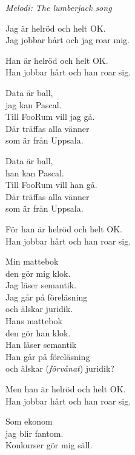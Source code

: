 {\footnotesize\textit{Melodi: The lumberjack song}}\par
\vspace{10pt}
Jag är helröd och helt OK.\\
Jag jobbar hårt och jag roar mig.\par
\vspace{10pt}
Han är helröd och helt OK.\\
Han jobbar hårt och han roar sig.\par
\vspace{10pt}
Data är ball,\\
jag kan Pascal.\\
Till FooRum vill jag gå.\\
Där träffas alla vänner\\
som är från Uppsala.\par
\vspace{10pt}
Data är ball,\\
han kan Pascal.\\
Till FooRum vill han gå.\\
Där träffas alla vänner\\
som är från Uppsala.\par
\vspace{10pt}
För han är helröd och helt OK.\\
Han jobbar hårt och han roar sig.\par
\vspace{10pt}
Min mattebok\\
den gör mig klok.\\
Jag läser semantik.\\
Jag går på föreläsning\\
och älskar juridik.\\
\newpage
Hans mattebok\\
den gör han klok.\\
Han läser semantik\\
Han går på föreläsning\\
och älskar (\textit{förvånat}) juridik?\par
\vspace{10pt}
Men han är helröd och helt OK.\\
Han jobbar hårt och han roar sig.\par
\vspace{10pt}
Som ekonom\\
jag blir fantom.\\
Konkurser gör mig säll.\\
